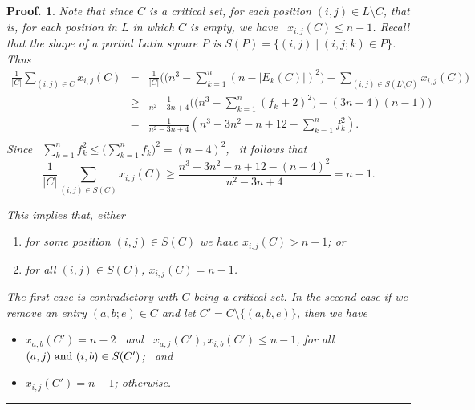 \documentclass[12pt]{report}
\newtheorem{preproof}{{\bf Proof.}}
\newenvironment{proof}[1]{\begin{preproof}{\rm
               #1}\hfill{\rule[-0.5mm]{2mm}{2mm}}}{\end{preproof}}
\begin{document}
\begin{proof}
{Note that since $C$ is a critical set, for each  position
$(i,j) \in L\setminus C$, that is, for each position in $L$ in which $C$ is
empty, we have \ $x_{i,j}(C) \leq n-1$.  Recall that the shape of a partial
Latin square $P$ is $S(P) = \{ (i,j) \mid (i,j;k) \in P \}$.  Thus
%
\begin{displaymath}
\begin{array}{ccl}
\displaystyle{\frac{1}{|C|}}{\displaystyle{\sum_{(i,j)\in C} x_{i,j}(C)}} & = &
\displaystyle{\frac{1}{|C|}}\Big( (n^3 -{\displaystyle{ \sum_{k=1}^{n}(n-|E_k(C)|)^2)}} -
{\displaystyle{\sum_{(i,j)\in S(L\setminus C)} x_{i,j}(C)}} \Big)    \\
%
&\ge &
\displaystyle{\frac{1}{n^2-3n+4}}\Big( (n^3 -{\displaystyle{ \sum_{k=1}^{n}(f_k+2)^2)}} -
(3n-4)(n-1) \Big)  \\
%
& = &
\displaystyle{\frac{1}{n^2-3n+4}}{\displaystyle(n^3 - 3n^2-n +12 -{\sum_{k=1}^{n}f^2_k})}. \\
%
\end{array}
\end{displaymath}
Since \
${\displaystyle{\sum_{k=1}^{n}f^2_k}} \le
{\displaystyle{(\sum_{k=1}^{n}f_k})^2} = (n-4)^2$, \ it follows that \\
%
$$
\displaystyle{\frac{1}{|C|}}{\displaystyle{\sum_{(i,j)\in S(C)} x_{i,j}(C)}} \ge
\displaystyle{\frac{n^3 - 3n^2-n +12 -(n-4)^2}{n^2-3n+4}} = n-1.
$$

\noindent
This implies that, either
\begin{enumerate}
\item[(i)]
for some position $(i,j)\in S(C)$ we have $x_{i,j}(C) > n-1$; or
\item[(ii)]
for all $(i,j)\in S(C)$,  $x_{i,j}(C) = n-1$.
\end{enumerate}
The first case is contradictory with $C$ being a critical set.
In the second case if we remove an entry $(a,b;e) \in C$ and let $C' = C \setminus \{ (a,b,e) \}$, then we have
\begin{itemize}
\item
 $x_{a,b}(C') = n-2$ \ and \
 $x_{a,j}(C') , x_{i,b}(C') \le n-1$, for all \ $(a,j) \ {\rm and} \ (i,b) \in S(C')$; \
 and
 \item
  $x_{i,j}(C') = n-1$; otherwise.
\end{itemize}

}
\end{proof}
\end{document}
